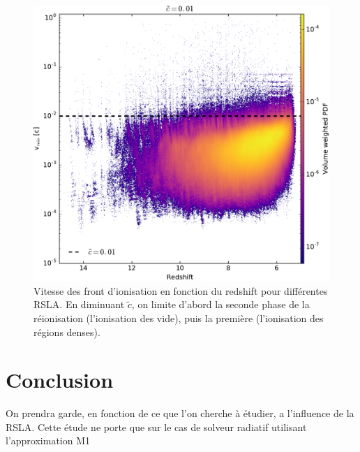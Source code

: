 \begin{figure}
		\includegraphics[height=.3\textheight]{img/04_mapreio/speedreio_z_c001.pdf} 
        \caption[Évolution de la vitesse des fronts]{Vitesse des front d'ionisation en fonction du redshift pour différentes RSLA.
        En diminuant $\tilde{c}$, on limite d'abord la seconde phase de la réionisation (l'ionisation des vide), puis la première (l'ionisation des régions denses).
        }        
 		\label{fig:vreioz}
\end{figure}




\clearpage
\section{Conclusion}



On prendra garde, en fonction de ce que l'on cherche à étudier, a l'influence de la \ac{RSLA}.
Cette étude ne porte que sur le cas de solveur radiatif utilisant l'approximation M1 %

